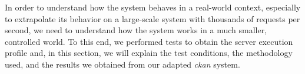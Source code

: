 \label{ref:chapter_4}

  In order to understand how the system behaves in a real-world context, especially to extrapolate its behavior on a large-scale system with thousands of requests per second, we need to understand how the system works in a much smaller, controlled world. To this end, we performed tests to obtain the server execution profile and, in this section, we will explain the test conditions, the methodology used, and the results we obtained from our adapted \textit{\gls{ckan}} system.